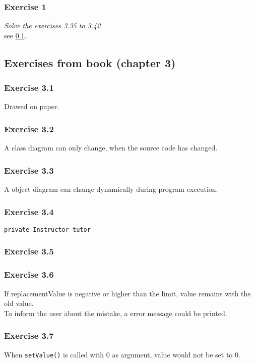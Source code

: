 \subsubsection*{Exercise 1}
\textit{Solve the exercises 3.35 to 3.42}\\
see \ref{book_oop4}. 

\subsection{Exercises from book (chapter 3)}
\label{book_oop4}

\subsubsection*{Exercise 3.1}
Drawed on paper. 

\subsubsection*{Exercise 3.2}
A class diagram can only change, when the source code has changed. 

\subsubsection*{Exercise 3.3}
A object diagram can change dynamically during program execution. 

\subsubsection*{Exercise 3.4}
\begin{lstlisting}
private Instructor tutor
\end{lstlisting}

\subsubsection*{Exercise 3.5}


\subsubsection*{Exercise 3.6}
If replacementValue is negative or higher than the limit, value remains with 
the old value. \\
To inform the user about the mistake, a error message could be printed. 

\subsubsection*{Exercise 3.7}
When \lstinline{setValue()} is called with 0 as argument, value would not be 
set to 0. 

